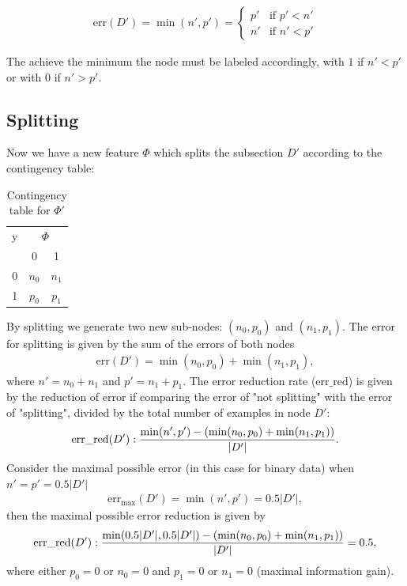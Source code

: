 \documentclass[12pt]{article}
\begin{document}
\begin{align}
	\text{err}(D') = \min(n',p') = 
	\begin{cases}
		p' & \text{if } p'< n' \\
		n' & \text{if } n'< p'
	\end{cases}
\end{align}

The achieve the minimum the node must be labeled accordingly, with $1$ if $n'< p'$ or with $0$ if $n'> p'$. 

\subsection{Splitting}

Now we have a new feature $\Phi$ which splits the subsection $D'$ according to the contingency table:
\begin{table}[htbp]
	\centering
	\begin{tabular}{|c|c|c|}
		\toprule
		y     & \multicolumn{2}{c|}{$\Phi$} \\
		& \multicolumn{1}{c}{0} & 1 \\
		\cmidrule{2-3}    0     & $n_0$    & $n_1$ \\
		\cmidrule{2-3}    1     & $p_0$    & $p_1$ \\
		\bottomrule
	\end{tabular}%
	\caption{Contingency table for $\Phi'$}
	\label{tab:tabel1}%
\end{table}%
By splitting we generate two new sub-nodes: $(n_0,p_0)$ and $(n_1,p_1)$. The error for splitting is given by the sum of the errors of both nodes
\begin{align}
\text{err}(D') = \min(n_0,p_0) + \min(n_1,p_1),
\end{align}
where $n'=n_0 + n_1$ and $p'=n_1+p_1$. The error reduction rate ($\text{err}\_\text{red}$) is given by the reduction of error if comparing the error of "not splitting" with the error of "splitting", divided by the total number of examples in node $D'$:
\begin{align}
\text{\text{err}\_\text{red}}(D'): \frac{\min(n',p')-\left(\min(n_0,p_0) + \min(n_1,p_1)\right)}{\lvert D' \rvert}.
\end{align} 
Consider the maximal possible error (in this case for binary data) when $n'=p'=0.5 \lvert D' \rvert$
\begin{align}
\text{err}_\text{max}(D')=\min(n',p')=0.5\lvert D' \rvert,
\end{align}
then the maximal possible error reduction is given by 
\begin{align}
\text{\text{err}\_\text{red}}(D'): \frac{\min(0.5 \lvert D'\rvert,0.5 \lvert D' \rvert)-\left(\min(n_0,p_0) + \min(n_1,p_1)\right)}{\lvert D' \rvert} = 0.5,
\end{align}
where either $p_0=0$ or $n_0=0$ and $p_1=0$ or $n_1=0$ (maximal information gain).
\end{document}
